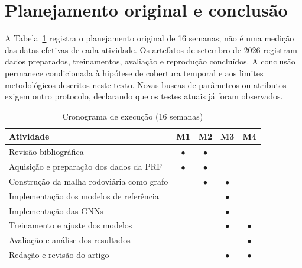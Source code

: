 \documentclass[12pt]{article}
\begin{document}
\clearpage
\section{Planejamento original e conclusão}

A Tabela~\ref{tab:cronograma} registra o planejamento original de
16 semanas; não é uma medição das datas efetivas de cada atividade.
Os artefatos de setembro de 2026 registram dados preparados,
treinamentos, avaliação e reprodução concluídos. A conclusão permanece
condicionada à hipótese de cobertura temporal e aos limites
metodológicos descritos neste texto. Novas buscas de parâmetros ou
atributos exigem outro protocolo, declarando que os testes atuais já
foram observados.

\begin{table}[ht]
\centering
\caption{Cronograma de execução (16 semanas)}
\label{tab:cronograma}
\begin{tabular}{>{\raggedright\arraybackslash}p{5.4cm}cccc}
\toprule
\textbf{Atividade} & \textbf{M1} & \textbf{M2} & \textbf{M3} & \textbf{M4} \\
\midrule
Revisão bibliográfica & $\bullet$ & $\bullet$ & & \\
Aquisição e preparação dos dados da PRF & $\bullet$ & $\bullet$ & & \\
Construção da malha rodoviária como grafo & & $\bullet$ & $\bullet$ & \\
Implementação dos modelos de referência & & & $\bullet$ & \\
Implementação das GNNs & & & $\bullet$ & \\
Treinamento e ajuste dos modelos & & & $\bullet$ & $\bullet$ \\
Avaliação e análise dos resultados & & & & $\bullet$ \\
Redação e revisão do artigo & & & $\bullet$ & $\bullet$ \\
\bottomrule
\end{tabular}
\end{table}
\end{document}
